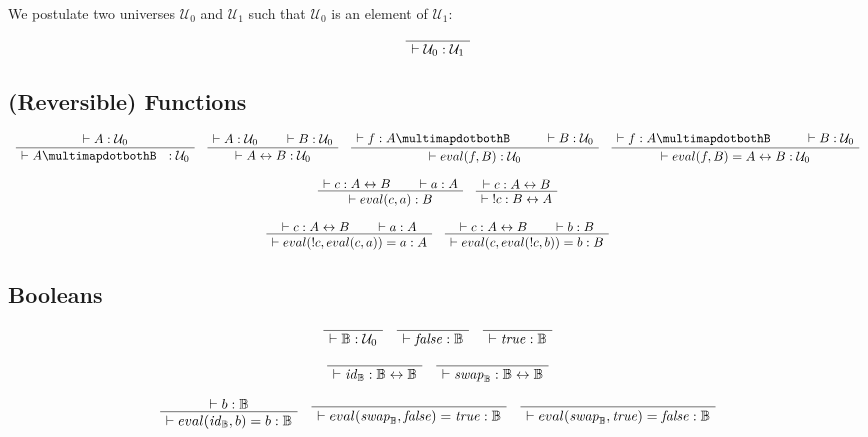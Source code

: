 \documentclass[format=acmlarge,review,natbib]{acmart}
\newcommand{\invc}[1]{!#1}
\newcommand{\evalone}[2]{eval(#1,#2)}
\newcommand{\idc}{\mathit{id}}
\newcommand{\swapc}{\mathit{swap}}
\newcommand{\iso}{\leftrightarrow}
\newcommand{\piso}{\multimapdotbothB~~}
\newcommand{\fc}{\mathit{false}}
\newcommand{\tc}{\mathit{true}}
\newcommand{\boolt}{\mathbb{B}}
\newcommand{\uzero}{\mathcal{U}_0}
\newcommand{\uone}{\mathcal{U}_1}
\newcommand{\proves}{\vdash}
\newcommand{\jdg}[2]{\proves #1 : #2}
\begin{document}
We postulate two universes $\uzero$ and $\uone$ such that $\uzero$ is an element
of $\uone$:

\[
  \AxiomC{}
  \UnaryInfC{$\jdg{\uzero}{\uone}$}
  \DisplayProof
\]

\subsection{(Reversible) Functions}

\[
  \begin{array}{c}
    \AxiomC{$\jdg{A}{\uzero}$}
    \UnaryInfC{$\jdg{A\piso}{\uzero}$}
    \DisplayProof
    \quad
    \AxiomC{$\jdg{A}{\uzero}$}
    \AxiomC{$\jdg{B}{\uzero}$}
    \BinaryInfC{$\jdg{A\iso B}{\uzero}$}
    \DisplayProof
    \quad
    \AxiomC{$\jdg{f}{A \piso}$}
    \AxiomC{$\jdg{B}{\uzero}$}
    \BinaryInfC{$\jdg{\evalone{f}{B}}{\uzero}$}
    \DisplayProof
    \quad
    \AxiomC{$\jdg{f}{A \piso}$}
    \AxiomC{$\jdg{B}{\uzero}$}
    \BinaryInfC{$\jdg{\evalone{f}{B} = A \iso B}{\uzero}$}
    \DisplayProof
    \\
    \\
    \AxiomC{$\jdg{c}{A \iso B}$}
    \AxiomC{$\jdg{a}{A}$}
    \BinaryInfC{$\jdg{\evalone{c}{a}}{B}$}
    \DisplayProof
    \quad
    \AxiomC{$\jdg{c}{A \iso B}$}
    \UnaryInfC{$\jdg{\;\invc{c}}{B \iso A}$}
    \DisplayProof
    \\
    \\
    \AxiomC{$\jdg{c}{A \iso B}$}
    \AxiomC{$\jdg{a}{A}$}
    \BinaryInfC{$\jdg{\evalone{\invc{c}}{\evalone{c}{a}} = a}{A}$}
    \DisplayProof
    \quad
    \AxiomC{$\jdg{c}{A \iso B}$}
    \AxiomC{$\jdg{b}{B}$}
    \BinaryInfC{$\jdg{\evalone{c}{\evalone{\invc{c}}{b}} = b}{B}$}
    \DisplayProof
  \end{array}
\]

\subsection{Booleans}

\[
  \begin{array}{c}
    \AxiomC{}
    \UnaryInfC{$\jdg{\boolt}{\uzero}$}
    \DisplayProof
    \quad
    \AxiomC{}
    \UnaryInfC{$\jdg{\fc}{\boolt}$}
    \DisplayProof
    \quad
    \AxiomC{}
    \UnaryInfC{$\jdg{\tc}{\boolt}$}
    \DisplayProof
    \\
    \\
    \AxiomC{}
    \UnaryInfC{$\jdg{\idc_{\boolt}}{\boolt\iso\boolt}$}
    \DisplayProof
    \quad
    \AxiomC{}
    \UnaryInfC{$\jdg{\swapc_{\boolt}}{\boolt\iso\boolt}$}
    \DisplayProof
    \\
    \\
    \AxiomC{$\jdg{b}{\boolt}$}
    \UnaryInfC{$\jdg{\evalone{\idc_{\boolt}}{b} = b}{\boolt}$}
    \DisplayProof
    \quad
    \AxiomC{}
    \UnaryInfC{$\jdg{\evalone{\swapc_{\boolt}}{\fc} = \tc}{\boolt}$}
    \DisplayProof
    \quad
    \AxiomC{}
    \UnaryInfC{$\jdg{\evalone{\swapc_{\boolt}}{\tc} = \fc}{\boolt}$}
    \DisplayProof
  \end{array}
\]
\end{document}
